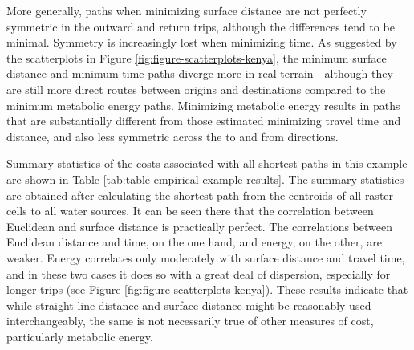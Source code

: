 \documentclass[]{elsarticle} %
\begin{document}
More generally, paths when minimizing surface distance are not perfectly
symmetric in the outward and return trips, although the differences tend
to be minimal. Symmetry is increasingly lost when minimizing time. As
suggested by the scatterplots in Figure
\ref{fig:figure-scatterplots-kenya}, the minimum surface distance and
minimum time paths diverge more in real terrain - although they are
still more direct routes between origins and destinations compared to
the minimum metabolic energy paths. Minimizing metabolic energy results
in paths that are substantially different from those estimated
minimizing travel time and distance, and also less symmetric across the
to and from directions.

Summary statistics of the costs associated with all shortest paths in
this example are shown in Table
\ref{tab:table-empirical-example-results}. The summary statistics are
obtained after calculating the shortest path from the centroids of all
raster cells to all water sources. It can be seen there that the
correlation between Euclidean and surface distance is practically
perfect. The correlations between Euclidean distance and time, on the
one hand, and energy, on the other, are weaker. Energy correlates only
moderately with surface distance and travel time, and in these two cases
it does so with a great deal of dispersion, especially for longer trips
(see Figure \ref{fig:figure-scatterplots-kenya}). These results indicate
that while straight line distance and surface distance might be
reasonably used interchangeably, the same is not necessarily true of
other measures of cost, particularly metabolic energy.
\end{document}
